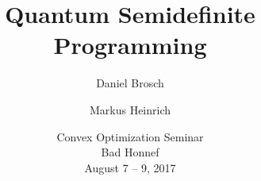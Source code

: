 \author{Daniel Brosch \and Markus Heinrich}
\title{Quantum Semidefinite Programming}
\date{
  Convex Optimization Seminar \\
  Bad Honnef \\
  August 7 -- 9, 2017
}

\newcommand{\ie}{i.\,e.}
\newcommand{\Ie}{I.\,e.}
\newcommand{\eg}{e.\,g.}
\newcommand{\Eg}{E.\,g.} 

\newcommand{\R}{\mathbb{R}}
\newcommand{\N}{\mathbb{N}}
\newcommand{\C}{\mathbb{C}}
\newcommand{\Z}{\mathbb{Z}}

\DeclareMathOperator{\Ric}{Ric}
\DeclareMathOperator{\Tr}{Tr}
\DeclareMathOperator{\sgn}{sgn}
\DeclareMathOperator{\Con}{Con}

\newcommand{\id}{\mathrm{id}}
\newcommand{\dd}{\,\mathrm{d}}

\newcommand{\Orth}{O}
\newcommand{\SOrth}{SO}
\newcommand{\orth}{\mathfrak{O}}
\newcommand{\sorth}{\mathfrak{so}}
\newcommand{\Conf}{\mathrm{CO}}
\newcommand{\conf}{\mathfrak{co}}
\newcommand{\U}{U}
\newcommand{\SU}{SU}

\newcommand{\vect}[1]{{\boldsymbol{#1}}}
\newcommand{\const}{\text{const}}
\newcommand{\Op}{\mathcal{O}}
\newcommand{\T}{\mathbb{T}}
\newcommand{\Sp}{\mathbb{Sp}}
\newcommand{\A}{\mathcal{A}}
\newcommand{\V}{\mathcal{V}}
\newcommand{\F}{\mathcal{F}}
\newcommand{\G}{\mathcal{G}}
\newcommand{\D}{\mathcal{D}}
\newcommand{\f}{\tilde{f}}
\newcommand{\aM}{\overline{a}}
\newcommand{\TM}{\overline{T}}
\newcommand{\JM}{\overline{J}_y}

\newcommand{\slashedd}[1]{#1\!\!\!/}